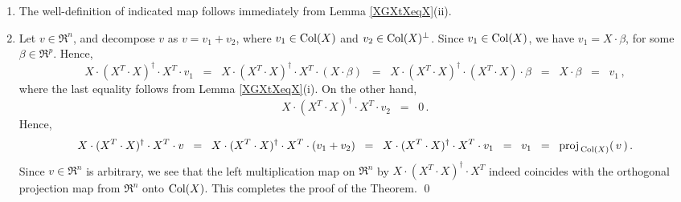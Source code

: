 \begin{enumerate}
\item
	The well-definition of indicated map follows immediately from Lemma \ref{XGXtXeqX}(ii).
\item
Let $v \in \Re^{n}$, and decompose $v$ as $v = v_{1} + v_{2}$,
where $v_{1} \in \textnormal{Col}(X)$ and $v_{2} \in \textnormal{Col}(X)^{\perp}$.
Since $v_{1} \in \textnormal{Col}(X)$, we have $v_{1} = X\cdot\beta$,
for some $\beta \in \Re^{p}$.
Hence,
\begin{equation*}
X \cdot (X^{T} \cdot X)^{\dagger} \cdot X^{T} \cdot v_{1}
\;\; = \;\;
	X \cdot (X^{T} \cdot X)^{\dagger} \cdot X^{T} \cdot (X \cdot \beta)
\;\; = \;\;
	X \cdot (X^{T} \cdot X)^{\dagger} \cdot (X^{T} \cdot X) \cdot \beta
\;\; = \;\;
	X \cdot \beta
\;\; = \;\;
	v_{1}\,,
\end{equation*}
where the last equality follows from Lemma \ref{XGXtXeqX}(i).
On the other hand,
\begin{equation*}
X \cdot (X^{T} \cdot X)^{\dagger} \cdot X^{T} \cdot v_{2}
\;\; = \;\;
	0\,.
\end{equation*}
Hence,
\begin{equation*}
X \cdot (X^{T} \cdot X)^{\dagger} \cdot X^{T} \cdot v
\;\; = \;\;
	X \cdot (X^{T} \cdot X)^{\dagger} \cdot X^{T} \cdot (v_{1} + v_{2})
\;\; = \;\;
	X \cdot (X^{T} \cdot X)^{\dagger} \cdot X^{T} \cdot v_{1}
\;\; = \;\;
	v_{1}
\;\; = \;\;
	\textnormal{proj}_{\,\textnormal{Col}(X)}(\,v\,)\,.
\end{equation*}
Since $v \in \Re^{n}$ is arbitrary, we see that the left multiplication map on $\Re^{n}$
by $X \cdot (X^{T} \cdot X)^{\dagger} \cdot X^{T}$ indeed coincides with the
orthogonal projection map from $\Re^{n}$ onto $\textnormal{Col}(X)$.
This completes the proof of the Theorem.
\qed
\end{enumerate}

